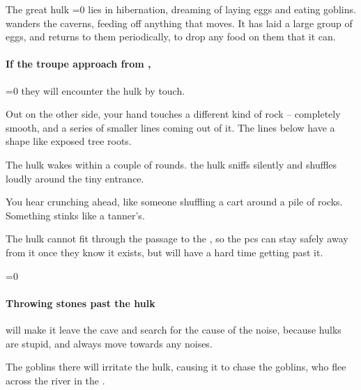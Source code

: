 \begin{multicols}{2}


\begin{exampletext}
  The great \gls{hulk}%
  \ifnum\value{temperature}=0
    lies in hibernation, dreaming of laying eggs and eating goblins.
  \else
    wanders the caverns, feeding off anything that moves.
    It has laid a large group of eggs, and returns to them periodically, to drop any food on them that it can.
  \fi
\end{exampletext}

\paragraph{If the troupe approach from ,}
\ifnum\value{temperature}=0%
  they will encounter the \gls{hulk} by touch.

  \begin{boxtext}
    Out on the other side, your hand touches a different kind of rock -- completely smooth, and a series of smaller lines coming out of it.
    The lines below have a shape like exposed tree roots.
  \end{boxtext}

  The \gls{hulk} wakes within a couple of \glspl{round}.
\else%
  the \gls{hulk} sniffs silently and shuffles loudly around the tiny entrance.

  \begin{boxtext}
    You hear crunching ahead, like someone shuffling a cart around a pile of rocks.
    Something stinks like a tanner's.
  \end{boxtext}
\fi

The \gls{hulk} cannot fit through the passage to the , so the \glspl{pc} can stay safely away from it once they know it exists, but will have a hard time getting past it.

\ifnum\value{temperature}=0\else
  \paragraph{Throwing stones past the \gls{hulk}}
  will make it leave the cave and search for the cause of the noise, because \glspl{hulk} are stupid, and always move towards any noises.
\fi

\umberhulk

The goblins there will irritate the \gls{hulk}, causing it to chase the goblins, who flee across the river in the .


\end{multicols}
